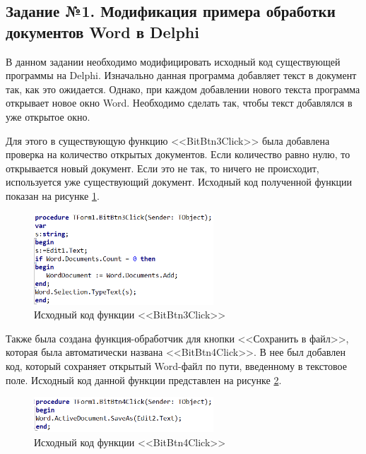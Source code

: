 \documentclass[a4paper, 14pt]{extarticle}
\begin{document}
\subsection*{
  Задание №1. Модификация примера обработки документов Word в Delphi
}

В данном задании необходимо модифицировать исходный код существующей программы
на \foreignlanguage{english}{Delphi}. Изначально данная программа добавляет
текст в документ так, как это ожидается. Однако, при каждом добавлении нового
текста программа открывает новое окно \foreignlanguage{english}{Word}.
Необходимо сделать так, чтобы текст добавлялся в уже открытое окно.

Для этого в существующую функцию <<\foreignlanguage{english}{BitBtn3Click}>>
была добавлена проверка на количество открытых документов. Если количество равно
нулю, то открывается новый документ. Если это не так, то ничего не происходит,
используется уже существующий документ. Исходный код полученной функции показан
на рисунке \ref{fig:task-1-1}.

\begin{figure}[H]
  \centering
  \includegraphics[width=0.6\textwidth]{images/task-1/1.png}
  \caption{Исходный код функции <<\foreignlanguage{english}{BitBtn3Click}>>}
  \label{fig:task-1-1}
\end{figure}

Также была создана функция-обработчик для кнопки <<Сохранить в файл>>, которая
была автоматически названа <<\foreignlanguage{english}{BitBtn4Click}>>. В нее
был добавлен код, который сохраняет открытый
\foreignlanguage{english}{Word}-файл по пути, введенному в текстовое поле.
Исходный код данной функции представлен на рисунке \ref{fig:task-1-2}.

\begin{figure}[H]
  \centering
  \includegraphics[width=0.6\textwidth]{images/task-1/2.png}
  \caption{Исходный код функции <<\foreignlanguage{english}{BitBtn4Click}>>}
  \label{fig:task-1-2}
\end{figure}
\end{document}

